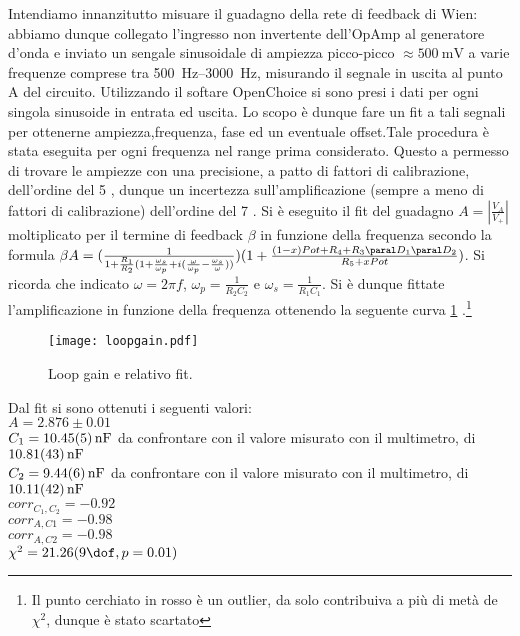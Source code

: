 Intendiamo innanzitutto misuare il guadagno della rete di feedback di Wien: abbiamo dunque collegato l'ingresso
non invertente dell'OpAmp al generatore d'onda e inviato un sengale sinusoidale di ampiezza picco-picco $\approx \SI{500}{\mV}$
a varie frequenze comprese tra \SIrange[range-phrase = \text{ e }]{500}{3000}{\Hz},
misurando il segnale in uscita al punto A del circuito. Utilizzando il softare OpenChoice si sono presi i dati per ogni singola sinusoide in entrata ed uscita. Lo scopo è dunque fare un fit a tali segnali per ottenerne ampiezza,frequenza, fase ed un eventuale offset.Tale procedura è stata eseguita per ogni frequenza nel range prima considerato. Questo a permesso di trovare le ampiezze con una precisione, a patto di fattori di calibrazione, dell'ordine del 5 \textperthousand , dunque un incertezza sull'amplificazione (sempre a meno di fattori di calibrazione) dell'ordine del 7 \textperthousand.
Si è eseguito il fit del guadagno $A=\left | \frac{V_A}{V_+} \right | $ moltiplicato per il termine di feedback $\beta$ in funzione della frequenza secondo la formula $\beta A= (\frac{1}{1+\frac{R_1}{R_2}(1+\frac{\omega_s}{\omega_p}+i(\frac{\omega}{\omega_p}-\frac{\omega_s}{\omega} ))})(1 + \frac{(1-x)Pot+R_4+R_3 \paral D_1 \paral D_2}{R_5+xPot})$. Si ricorda che indicato $\omega=2 \pi f$, $\omega_p= \frac{1}{R_2C_2}$ e $\omega_s=\frac{1}{R_1C_1}$. Si è dunque fittate l'amplificazione in funzione della frequenza ottenendo la seguente curva \ref{f:lpgn} .\footnote{Il punto cerchiato in rosso è un outlier, da solo contribuiva a più di metà de $\chi^2$, dunque è stato scartato}


\begin{figure}[h]
	\centering
	\texttt{[image: loopgain.pdf]}
	\caption{Loop gain e relativo fit.}
	\label{f:lpgn}
\end{figure}

Dal fit si sono ottenuti i seguenti valori:\\
$A=2.876 \pm 0.01$\\
$C_1=\SI{10.45 \pm 0.05}{nF}$ da confrontare con il valore misurato con il multimetro, di $\SI{10.81\pm 0.43}{nF}$\\
$C_2=\SI{9.44\pm 0.06}{nF}$ da confrontare con il valore misurato con il multimetro, di $\SI{10.11\pm 0.42}{nF}$\\
$corr_{C_1, C_2}=-0.92$\\
$corr_{A,C1}=-0.98$\\
$corr_{A,C2}=-0.98$\\
$\chi^2=21.26 (9 \dof, p = 0.01)$


